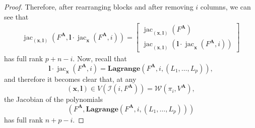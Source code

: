 \documentclass[12pt]{article}
\def\mA{{\bm A}}
\def\lb{{\bm l}}
\def\xb{{\bm x}}
\DeclareMathOperator{\jac}{jac}
\def\lagFA{{\bm{Lagrange}}(F^{\mA},i,(L_1,\hdots,L_p))}
\def\IilAnu{\mathscr{I}(i,F^{\mA})}
\def\WilAnu{\mathscr{W}(\pi_i,V^{\mA})}
\begin{document}
\begin{proof}
    Therefore, after rearranging blocks and after removing $i$ columns, we can see that 
    \begin{align}
    \jac_{(\xb, \lb)}\left( F^{\mA},\bm l \cdot \jac_{\xb}(F^{\mA},i)\right) =
    \left[ 
    \begin{array}{c}
    \jac_{(\xb,\lb)}(F^{\mA}) \\
    \jac_{(\xb,\lb)}\left(\bm l \cdot \jac_{\xb}(F^{\mA},i) \right) 
    \end{array}
    \right]
    \end{align}
    has full rank $p + n-i$. Now, recall that
    \[
    \bm l \cdot \jac_{\xb}(F^{\mA},i) = \lagFA,
    \]
    and therefore it becomes clear that, at any 
    \[(\xb,\lb) \in V(\IilAnu)=\WilAnu,\]
    the Jacobian of the polynomials 
    \[
    \left(F^{\mA},\lagFA\right)
    \]
    has full rank $n+p-i$. 
    \end{proof}
    
\end{document}
